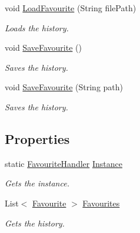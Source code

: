 \begin{DoxyCompactItemize}
void \hyperlink{class_assessment___two___logic_1_1_model_1_1_favourite_handler_a6bf55d9652d9f55c56280c1edfdc68f5}{LoadFavourite} (String filePath)
\begin{DoxyCompactList}\small\item\em Loads the history. \item\end{DoxyCompactList}\item 
void \hyperlink{class_assessment___two___logic_1_1_model_1_1_favourite_handler_a043ce191da02f4ac9780efd484747f98}{SaveFavourite} ()
\begin{DoxyCompactList}\small\item\em Saves the history. \item\end{DoxyCompactList}\item 
void \hyperlink{class_assessment___two___logic_1_1_model_1_1_favourite_handler_a4c255d62b5b4843e43f27c0515e42db4}{SaveFavourite} (String path)
\begin{DoxyCompactList}\small\item\em Saves the history. \item\end{DoxyCompactList}\end{DoxyCompactItemize}
\subsection*{Properties}
\begin{DoxyCompactItemize}
\item 
static \hyperlink{class_assessment___two___logic_1_1_model_1_1_favourite_handler}{FavouriteHandler} \hyperlink{class_assessment___two___logic_1_1_model_1_1_favourite_handler_a26cef8791fc8ec1e782f27ca800eef8b}{Instance}
\begin{DoxyCompactList}\small\item\em Gets the instance. \item\end{DoxyCompactList}\item 
List$<$ \hyperlink{class_assessment___two___logic_1_1_model_1_1_favourite}{Favourite} $>$ \hyperlink{class_assessment___two___logic_1_1_model_1_1_favourite_handler_a66aa982f81b5981d93f7793fee25d6c1}{Favourites}
\begin{DoxyCompactList}\small\item\em Gets the history. \item\end{DoxyCompactList}\end{DoxyCompactItemize}
